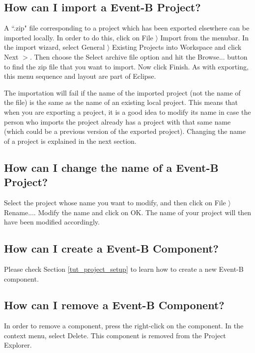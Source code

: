 \subsection{How can I import a Event-B Project?}

A ``.zip" file corresponding to a project which has been exported elsewhere can be imported locally. In order to do this, click on \textsf{File $\rangle$ Import} from the menubar. In the import wizard, select \textsf{General $\rangle$ Existing Projects into Workspace} and click \textsf{Next $>$}. Then choose the \textsf{Select archive file} option and hit the \textsf{Browse...} button to find the zip file that you want to import. Now click \textsf{Finish}. As with exporting, this menu sequence and layout are part of Eclipse.

The importation will fail if the name of the imported project (not the name of the file) is the same as the name of an existing local project. This means that when you are exporting a project, it is a good idea to modify its name in case the person who imports the project already has a project with that same name (which could be a previous version of the exported project). Changing the name of a project is explained in the next section. 

\subsection{How can I change the name of a Event-B Project?}

Select the project whose name you want to modify, and then click on \textsf{File $\rangle$ Rename...}. Modify the name and click on \textsf{OK}. The name of your project will then have been modified accordingly. 

\subsection{How can I create a Event-B Component?}

Please check Section \ref{tut_project_setup} to learn how to create a new Event-B component.

\subsection{How can I remove a Event-B Component?}

In order to remove a component, press the right-click on the component. In the context menu, select \textsf{Delete}. This component is removed from the \textsf{Project Explorer}. 

